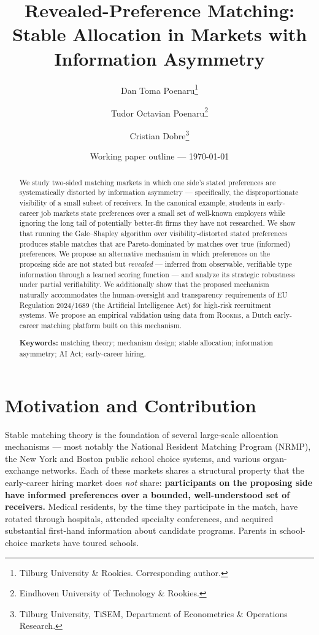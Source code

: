 \documentclass[11pt,a4paper]{article}
\title{\textbf{Revealed-Preference Matching:}\\[0.4em]
       \large Stable Allocation in Markets with Information Asymmetry}
\author{
    Dan Toma Poenaru\thanks{Tilburg University \& Rookies. Corresponding author.}
    \and Tudor Octavian Poenaru\thanks{Eindhoven University of Technology \& Rookies.}
    \and Cristian Dobre\thanks{Tilburg University, TiSEM, Department of Econometrics \& Operations Research.}
}
\date{Working paper outline --- \today}
\begin{document}
\maketitle

\begin{abstract}
We study two-sided matching markets in which one side's stated preferences are systematically distorted by information asymmetry --- specifically, the disproportionate visibility of a small subset of receivers. In the canonical example, students in early-career job markets state preferences over a small set of well-known employers while ignoring the long tail of potentially better-fit firms they have not researched. We show that running the Gale--Shapley algorithm over visibility-distorted stated preferences produces stable matches that are Pareto-dominated by matches over true (informed) preferences. We propose an alternative mechanism in which preferences on the proposing side are not stated but \emph{revealed} --- inferred from observable, verifiable type information through a learned scoring function --- and analyze its strategic robustness under partial verifiability. We additionally show that the proposed mechanism naturally accommodates the human-oversight and transparency requirements of EU Regulation 2024/1689 (the Artificial Intelligence Act) for high-risk recruitment systems. We propose an empirical validation using data from \textsc{Rookies}, a Dutch early-career matching platform built on this mechanism.

\medskip
\noindent\textbf{Keywords:} matching theory; mechanism design; stable allocation; information asymmetry; AI Act; early-career hiring.
\end{abstract}

\section{Motivation and Contribution}
\label{sec:intro}

Stable matching theory \citep{galeShapley1962,rothSotomayor1990} is the foundation of several large-scale allocation mechanisms --- most notably the National Resident Matching Program (NRMP), the New York and Boston public school choice systems, and various organ-exchange networks. Each of these markets shares a structural property that the early-career hiring market does \emph{not} share: \textbf{participants on the proposing side have informed preferences over a bounded, well-understood set of receivers.} Medical residents, by the time they participate in the match, have rotated through hospitals, attended specialty conferences, and acquired substantial first-hand information about candidate programs. Parents in school-choice markets have toured schools.
\end{document}
